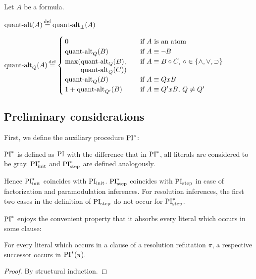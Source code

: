 \begin{defi}
	Let $A$ be a formula.\nopagebreak
	\medskip

	\noindent
	$\qa(A) \defeq \qa_\bot(A)$
	\nopagebreak
	\medskip

	\noindent
	$
	\qa_Q(A) \defeq 
	\begin{cases}
		0 & \text{if $A$ is an atom} \\
		\qa_Q(B) & \text{if $A \equiv \lnot B$} \\
		\max(\parbox[t]{0.22\textwidth}{$\qa_Q(B),$\newline$ \qa_Q(C))$} & \text{if $A \equiv B \circ C$, $\circ \in \{\land, \lor, \limpl\}$} \\
		\qa_Q(B) & \text{if $A \equiv Q x B$} \\
		1+\qa_{Q'}(B) & \text{if $A \equiv Q' x B$, $Q \neq Q'$}  \\
	\end{cases}
	$
	\nopagebreak

	\qedhere
\end{defi}


\subsection{Preliminary considerations}


First, we define the auxiliary procedure $\PI^*$:


\begin{defi}[$\PI^*$]
	$\PI^*$ is defined as $\operatorname{PI}$ with the difference that in $\PI^*$, all literals are considered to be gray.
	$\operatorname{PI}_{\mathrm{init}}^*$ and $\operatorname{PI}_{\mathrm{step}}^*$ are defined analogously.
\end{defi}

Hence $\operatorname{PI}_{\mathrm{init}}^*$ coincides with $\operatorname{PI}_{\mathrm{init}}$.
$\operatorname{PI}_{\mathrm{step}}^*$ coincides with $\operatorname{PI}_{\mathrm{step}}$ in case of factorization and paramodulation inferences.
For resolution inferences, the first two cases in the definition of $\operatorname{PI}_{\mathrm{step}}$ do not occur for $\operatorname{PI}_{\mathrm{step}}^*$.

$\PI^*$ enjoys the convenient property that it absorbs every literal which occurs in some clause:

\begin{prop}
	\label{prop:every_lit_in_pi_star}
	For every literal which occurs in a clause of a resolution refutation $\pi$, a respective successor occurs in $\operatorname{PI}^*(\pi)$.
\end{prop}
\begin{proof}
	By structural induction.
\end{proof}

